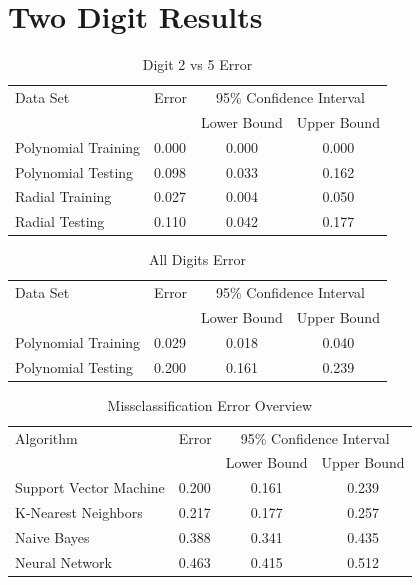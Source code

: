 \documentclass{article}
\begin{document}
\section{Two Digit Results}\label{Results2}



\begin{table}
\caption{Digit 2 vs 5 Error}
\begin{center}
\begin{tabular}{llcc}
\toprule
Data Set & Error & \multicolumn{2}{c}{95\% Confidence Interval} \\
\cmidrule(r){3-4}
& & Lower Bound & Upper Bound \\
\midrule
Polynomial Training & 0.000 & 0.000 & 0.000 \\
Polynomial Testing & 0.098 & 0.033 & 0.162 \\
Radial Training & 0.027 & 0.004 & 0.050 \\
Radial Testing & 0.110 & 0.042 & 0.177 \\
\bottomrule
\end{tabular}
\label{error1}
\end{center}
\end{table}

\begin{table}
\caption{All Digits Error}
\begin{center}
\begin{tabular}{llcc}
\toprule
Data Set & Error & \multicolumn{2}{c}{95\% Confidence Interval} \\
\cmidrule(r){3-4}
& & Lower Bound & Upper Bound \\
\midrule
Polynomial Training & 0.029 & 0.018 & 0.040 \\
Polynomial Testing & 0.200 & 0.161 & 0.239 \\
\bottomrule
\end{tabular}
\label{error2}
\end{center}
\end{table}


\begin{table}
\caption{Missclassification Error Overview}
\begin{center}
\begin{tabular}{llcc}
\toprule
Algorithm & Error & \multicolumn{2}{c}{95\% Confidence Interval} \\
\cmidrule(r){3-4}
& & Lower Bound & Upper Bound \\
\midrule
Support Vector Machine & 0.200 & 0.161 & 0.239 \\
K-Nearest Neighbors & 0.217 & 0.177 & 0.257 \\
Naive Bayes & 0.388 &  0.341 & 0.435  \\
Neural Network & 0.463 &  0.415 & 0.512  \\
\bottomrule
\end{tabular}
\label{error3}
\end{center}
\end{table}
\end{document}
